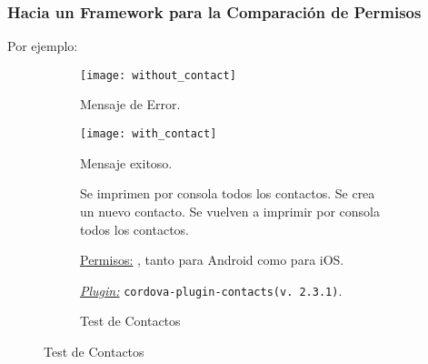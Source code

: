 \begin{frame}
 \frametitle{Hacia un Framework para la Comparación de Permisos}
Por ejemplo:
\begin{figure}[hbp]
    \centering
    \begin{subfigure}{0.28\linewidth}
        \texttt{[image: without\_contact]}
        \caption{Mensaje de Error.}
    \end{subfigure}
    \begin{subfigure}{0.28\linewidth}
        \texttt{[image: with\_contact]}
                \caption{Mensaje exitoso.}
     \end{subfigure}
	\begin{subfigure}{.42\linewidth}
	\begin{algorithm}[H]
    \scriptsize
	\begin{algorithmic}[1]
		\STATE Se imprimen por consola todos los contactos.
		\STATE Se crea un nuevo contacto.
		\STATE Se vuelven a imprimir por consola \\todos los contactos.
	\end{algorithmic}
	\caption{Test de Contactos}
   \end{algorithm}
   \begin{block}{}\small
    {\underline{Permisos:} \texttt{}, tanto para Android como para iOS.}
   \end{block}
   \begin{block}{}\tiny
 {\underline{\textit{Plugin:}} \texttt{cordova-plugin-contacts(v. 2.3.1)}.}
   \end{block}
   \end{subfigure}
    \end{figure}
\end{frame}
